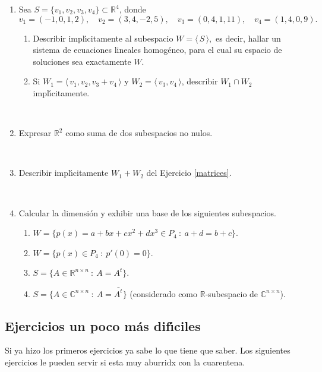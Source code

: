 \documentclass[12pt]{amsart}
\begin{document}
\begin{enumerate}[resume]
\

    \item Sea  $S=\{v_1,v_2,v_3,v_4\}\subset\mathbb R^4$, donde
$$v_1=(-1,0,1,2), \quad v_2=(3,4,-2,5), \quad v_3=(0,4,1,11), \quad v_4=(1,4,0,9).$$
\begin{enumerate}
	\item  Describir impl{\'\i}citamente al subespacio  $W= \langle \, S\, \rangle,$ es decir,
	hallar un sistema de ecuaciones lineales homog\'eneo, para el cual su espacio de soluciones sea exactamente $W$.
	\item Si $W_1 = \langle \, v_1,v_2,v_3+v_4\, \rangle $ y $W_2 = \langle \, v_3,v_4\, \rangle $,
	describir $W_1\cap W_2$ impl{\'\i}citamente.
\end{enumerate}

\	

\item 	Expresar ${\mathbb  R}^2$ como suma de dos subespacios no nulos.

\
 \item Describir impl{\'\i}citamente $W_1+W_2$ del Ejercicio \eqref{matrices}.

\

\item Calcular la dimensi\'on y exhibir una base de los siguientes subespacios.
\begin{enumerate}
	\item $W = \{ p(x)=a+bx+cx^2+dx^3\in P_4 \ : \ a+d=b+c \}$.
\item $W= \{ p(x)\in P_4 \ : \ p'(0)=0 \}$.
	\item $S = \{A \in \mathbb{R}^{n\times n} \ : \ A = A^t\}$.
	\item $S = \{A \in \mathbb{C}^{n\times n} \ : \ A = \bar{A^t}\}$ (considerado como $\mathbb{R}$-subespacio de $\mathbb{C}^{n\times n}$).
\end{enumerate}


\end{enumerate}

\subsection*{Ejercicios un poco m\'as dif\' \i ciles} 

Si ya hizo los primeros ejercicios ya sabe lo que tiene que saber. Los siguientes ejercicios le pueden servir si esta muy aburridx con la cuarentena. 
\end{document}
